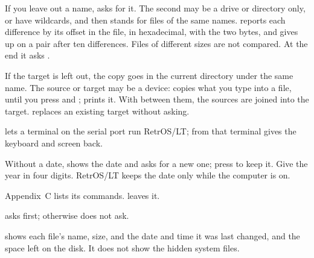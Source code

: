 If you leave out a name,  asks for it. The second may be a
drive or directory only, or have wildcards, and then stands for files of
the same names.  reports each difference by its offset in the
file, in hexadecimal, with the two bytes, and gives up on a pair after ten
differences. Files of different sizes are not compared. At the end it asks
.

\begin{opts}
\end{opts}
If the target is left out, the copy goes in the current directory under
the same name. The source or target may be a device:  copies what you type into a file, until you press  and
;  prints it. With \typed{+} between
them, the sources are joined into the target.  replaces an
existing target without asking.

 lets a terminal on the serial port run RetrOS/LT;
 from that terminal gives the keyboard and screen back.

Without a date,  shows the date and asks for a new one; press
 to keep it. Give the year in four digits. RetrOS/LT keeps the
date only while the computer is on.

Appendix~C lists its commands.  leaves it.

 asks  first; otherwise
 does not ask.

\begin{opts}
\end{opts}
 shows each file's name, size, and the date and time it was last
changed, and the space left on the disk. It does not show the hidden system
files.

